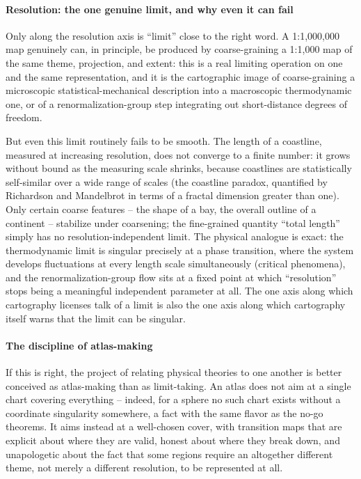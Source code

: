 \paragraph{Resolution: the one genuine limit, and why even it can fail}


Only along the resolution axis is ``limit'' close to the right word. A
1:1{,}000{,}000 map genuinely can, in principle, be produced by coarse-graining
a 1:1{,}000 map of the same theme, projection, and extent: this is a real
limiting operation on one and the same representation, and it is the
cartographic image of coarse-graining a microscopic statistical-mechanical
description into a macroscopic thermodynamic one, or of a renormalization-group
step integrating out short-distance degrees of freedom.

But even this limit routinely fails to be smooth. The length of a coastline,
measured at increasing resolution, does not converge to a finite number: it
grows without bound as the measuring scale shrinks, because coastlines are
statistically self-similar over a wide range of scales (the coastline paradox,
quantified by Richardson and Mandelbrot in terms of a fractal dimension greater
than one). Only certain coarse features -- the shape of a bay, the overall
outline of a continent -- stabilize under coarsening; the fine-grained quantity
``total length'' simply has no resolution-independent limit. The physical
analogue is exact: the thermodynamic limit is singular precisely at a phase
transition, where the system develops fluctuations at every length scale
simultaneously (critical phenomena), and the renormalization-group flow sits at
a fixed point at which ``resolution'' stops being a meaningful independent
parameter at all. The one axis along which cartography licenses talk of a limit
is also the one axis along which cartography itself warns that the limit can be
singular.

\paragraph{The discipline of atlas-making}

If this is right, the project of relating physical theories to one another is
better conceived as atlas-making than as limit-taking. An atlas does not aim at
a single chart covering everything -- indeed, for a sphere no such chart exists
without a coordinate singularity somewhere, a fact with the same flavor as the
no-go theorems. It aims instead at a well-chosen cover, with transition maps
that are explicit about where they are valid, honest about where they break
down, and unapologetic about the fact that some regions require an altogether
different theme, not merely a different resolution, to be represented at all.

